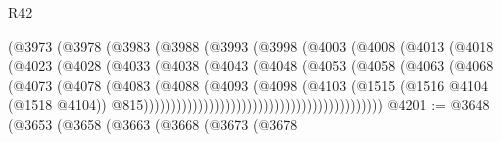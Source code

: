 \begin{lexlean}{R42}
\begin{coremodule}
{                                    (@3973
                                      (@3978
                                        (@3983
                                          (@3988
                                            (@3993
                                              (@3998
                                                (@4003
                                                  (@4008
                                                    (@4013
                                                      (@4018
                                                        (@4023
                                                          (@4028
                                                            (@4033
                                                              (@4038
                                                                (@4043
                                                                  (@4048
                                                                    (@4053
                                                                      (@4058
                                                                        (@4063
                                                                          (@4068
                                                                            (@4073
                                                                              (@4078
                                                                                (@4083
                                                                                  (@4088
                                                                                    (@4093
                                                                                      (@4098
                                                                                        (@4103
                                                                                          (@1515
                                                                                            (@1516
                                                                                              @4104
                                                                                              (@1518
                                                                                                @4104))
                                                                                            @815))))))))))))))))))))))))))))))))))))))))))))
@4201 := @3648
    (@3653
      (@3658
        (@3663
          (@3668
            (@3673
              (@3678
}
\end{coremodule}
\end{lexlean}
